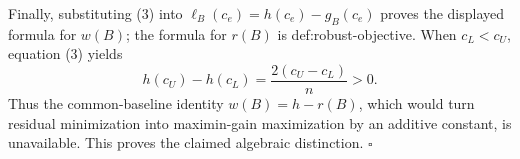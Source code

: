 Finally, substituting (3) into \(\ell_B(c_e)=h(c_e)-g_B(c_e)\) proves the displayed formula for \(w(B)\); the formula for \(r(B)\) is def:robust-objective. When \(c_L<c_U\), equation (3) yields
\[
h(c_U)-h(c_L)=\frac{2(c_U-c_L)}n>0.
\]
Thus the common-baseline identity \(w(B)=h-r(B)\), which would turn residual minimization into maximin-gain maximization by an additive constant, is unavailable. This proves the claimed algebraic distinction. \(\square\)